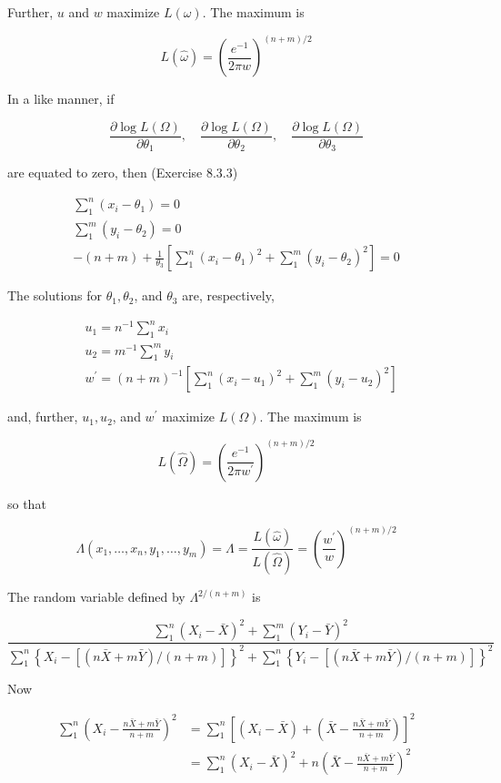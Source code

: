 Further, $u$ and $w$ maximize $L(\omega)$. The maximum is

$$
L(\hat{\omega})=\left(\frac{e^{-1}}{2 \pi w}\right)^{(n+m) / 2}
$$

In a like manner, if

$$
\frac{\partial \log L(\Omega)}{\partial \theta_{1}}, \quad \frac{\partial \log L(\Omega)}{\partial \theta_{2}}, \quad \frac{\partial \log L(\Omega)}{\partial \theta_{3}}
$$

are equated to zero, then (Exercise 8.3.3)


\begin{gather*}
\sum_{1}^{n}\left(x_{i}-\theta_{1}\right)=0 \\
\sum_{1}^{m}\left(y_{i}-\theta_{2}\right)=0  \tag{8.3.3}\\
-(n+m)+\frac{1}{\theta_{3}}\left[\sum_{1}^{n}\left(x_{i}-\theta_{1}\right)^{2}+\sum_{1}^{m}\left(y_{i}-\theta_{2}\right)^{2}\right]=0
\end{gather*}


The solutions for $\theta_{1}, \theta_{2}$, and $\theta_{3}$ are, respectively,

$$
\begin{aligned}
& u_{1}=n^{-1} \sum_{1}^{n} x_{i} \\
& u_{2}=m^{-1} \sum_{1}^{m} y_{i} \\
& w^{\prime}=(n+m)^{-1}\left[\sum_{1}^{n}\left(x_{i}-u_{1}\right)^{2}+\sum_{1}^{m}\left(y_{i}-u_{2}\right)^{2}\right]
\end{aligned}
$$

and, further, $u_{1}, u_{2}$, and $w^{\prime}$ maximize $L(\Omega)$. The maximum is

$$
L(\hat{\Omega})=\left(\frac{e^{-1}}{2 \pi w^{\prime}}\right)^{(n+m) / 2}
$$

so that

$$
\Lambda\left(x_{1}, \ldots, x_{n}, y_{1}, \ldots, y_{m}\right)=\Lambda=\frac{L(\hat{\omega})}{L(\hat{\Omega})}=\left(\frac{w^{\prime}}{w}\right)^{(n+m) / 2}
$$

The random variable defined by $\Lambda^{2 /(n+m)}$ is

$$
\frac{\sum_{1}^{n}\left(X_{i}-\bar{X}\right)^{2}+\sum_{1}^{m}\left(Y_{i}-\bar{Y}\right)^{2}}{\sum_{1}^{n}\left\{X_{i}-[(n \bar{X}+m \bar{Y}) /(n+m)]\right\}^{2}+\sum_{1}^{n}\left\{Y_{i}-[(n \bar{X}+m \bar{Y}) /(n+m)]\right\}^{2}}
$$

Now

$$
\begin{aligned}
\sum_{1}^{n}\left(X_{i}-\frac{n \bar{X}+m \bar{Y}}{n+m}\right)^{2} & =\sum_{1}^{n}\left[\left(X_{i}-\bar{X}\right)+\left(\bar{X}-\frac{n \bar{X}+m \bar{Y}}{n+m}\right)\right]^{2} \\
& =\sum_{1}^{n}\left(X_{i}-\bar{X}\right)^{2}+n\left(\bar{X}-\frac{n \bar{X}+m \bar{Y}}{n+m}\right)^{2}
\end{aligned}
$$

